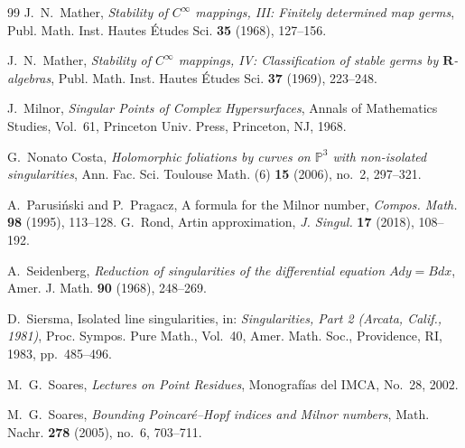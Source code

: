 \documentclass[10pt,twoside]{amsart}
\numberwithin{equation}{section}
\theoremstyle{definition}
\theoremstyle{remark}
\newcommand{\R}{\mathbf{R}}
\begin{document}
\begin{thebibliography}{99}
J.~N.~Mather,
\emph{Stability of $C^\infty$ mappings, III: Finitely determined map germs},
Publ. Math. Inst. Hautes \'Etudes Sci. \textbf{35} (1968), 127--156.

J.~N.~Mather,
\emph{Stability of $C^\infty$ mappings, IV: Classification of stable germs by $\R$-algebras},
Publ. Math. Inst. Hautes \'Etudes Sci. \textbf{37} (1969), 223--248.

J.~Milnor,
\emph{Singular Points of Complex Hypersurfaces},
Annals of Mathematics Studies, Vol.~61,
Princeton Univ. Press, Princeton, NJ, 1968.

G.~Nonato Costa,
\emph{Holomorphic foliations by curves on $\mathbb{P}^{3}$ with non-isolated singularities},
Ann. Fac. Sci. Toulouse Math. (6) \textbf{15} (2006), no.~2, 297--321.

A.~Parusi\'nski and P.~Pragacz,
A formula for the Milnor number,
\emph{Compos. Math.} \textbf{98} (1995), 113--128.
G.~Rond,
Artin approximation,
\emph{J. Singul.} \textbf{17} (2018), 108--192.

A.~Seidenberg,
\emph{Reduction of singularities of the differential equation $Ady=Bdx$},
Amer. J. Math. \textbf{90} (1968), 248--269.

D.~Siersma,
Isolated line singularities,
in: \emph{Singularities, Part 2 (Arcata, Calif., 1981)},
Proc. Sympos. Pure Math., Vol.~40,
Amer. Math. Soc., Providence, RI, 1983, pp.~485--496.

M.~G.~Soares,
\emph{Lectures on Point Residues},
Monograf\'ias del IMCA, No.~28, 2002.

M.~G.~Soares,
\emph{Bounding Poincar\'e--Hopf indices and Milnor numbers},
Math. Nachr. \textbf{278} (2005), no.~6, 703--711.


\end{thebibliography}
\end{document}

